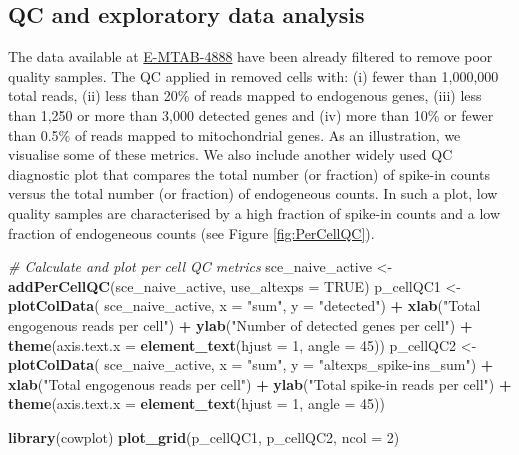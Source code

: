 \documentclass[9pt,a4paper,]{extarticle}
\newenvironment{Shaded}{\begin{snugshade}}{\end{snugshade}}
\newcommand{\CommentTok}[1]{\textcolor[rgb]{0.56,0.35,0.01}{\textit{#1}}}
\newcommand{\DataTypeTok}[1]{\textcolor[rgb]{0.13,0.29,0.53}{#1}}
\newcommand{\DecValTok}[1]{\textcolor[rgb]{0.00,0.00,0.81}{#1}}
\newcommand{\KeywordTok}[1]{\textcolor[rgb]{0.13,0.29,0.53}{\textbf{#1}}}
\newcommand{\NormalTok}[1]{#1}
\newcommand{\OperatorTok}[1]{\textcolor[rgb]{0.81,0.36,0.00}{\textbf{#1}}}
\newcommand{\OtherTok}[1]{\textcolor[rgb]{0.56,0.35,0.01}{#1}}
\newcommand{\StringTok}[1]{\textcolor[rgb]{0.31,0.60,0.02}{#1}}
\begin{document}
\hypertarget{qc-and-exploratory-data-analysis-1}{%
\subsection{QC and exploratory data analysis}\label{qc-and-exploratory-data-analysis-1}}

The data available at
\href{https://www.ebi.ac.uk/arrayexpress/experiments/E-MTAB-4888/}{E-MTAB-4888} have
been already filtered to remove poor quality samples.
The QC applied in \citep{Martinez-jimenez2017} removed cells with: (i) fewer
than 1,000,000 total reads, (ii) less than 20\% of reads mapped to
endogenous genes, (iii) less than 1,250 or more than 3,000 detected genes and
(iv) more than 10\% or fewer than 0.5\% of reads mapped to mitochondrial genes.
As an illustration, we visualise some of these metrics.
We also include another widely used QC diagnostic plot that compares the total
number (or fraction) of spike-in counts versus the total number (or fraction) of
endogeneous counts.
In such a plot, low quality samples are characterised by a high fraction of
spike-in counts and a low fraction of endogeneous counts
(see Figure \ref{fig:PerCellQC}).

\begin{Shaded}
\begin{Highlighting}[]
\CommentTok{# Calculate and plot per cell QC metrics}
\NormalTok{sce_naive_active <-}\StringTok{ }\KeywordTok{addPerCellQC}\NormalTok{(sce_naive_active, }\DataTypeTok{use_altexps =} \OtherTok{TRUE}\NormalTok{)}
\NormalTok{p_cellQC1 <-}\StringTok{ }\KeywordTok{plotColData}\NormalTok{(}
\NormalTok{  sce_naive_active, }
  \DataTypeTok{x =} \StringTok{"sum"}\NormalTok{, }
  \DataTypeTok{y =} \StringTok{"detected"}\NormalTok{) }\OperatorTok{+}
\StringTok{  }\KeywordTok{xlab}\NormalTok{(}\StringTok{"Total engogenous reads per cell"}\NormalTok{) }\OperatorTok{+}
\StringTok{  }\KeywordTok{ylab}\NormalTok{(}\StringTok{"Number of detected genes per cell"}\NormalTok{) }\OperatorTok{+}
\StringTok{  }\KeywordTok{theme}\NormalTok{(}\DataTypeTok{axis.text.x =} \KeywordTok{element_text}\NormalTok{(}\DataTypeTok{hjust =} \DecValTok{1}\NormalTok{, }\DataTypeTok{angle =} \DecValTok{45}\NormalTok{))}
\NormalTok{p_cellQC2 <-}\StringTok{ }\KeywordTok{plotColData}\NormalTok{(}
\NormalTok{  sce_naive_active, }
  \DataTypeTok{x =} \StringTok{"sum"}\NormalTok{, }
  \DataTypeTok{y =} \StringTok{"altexps_spike-ins_sum"}\NormalTok{) }\OperatorTok{+}
\StringTok{  }\KeywordTok{xlab}\NormalTok{(}\StringTok{"Total engogenous reads per cell"}\NormalTok{) }\OperatorTok{+}
\StringTok{  }\KeywordTok{ylab}\NormalTok{(}\StringTok{"Total spike-in reads per cell"}\NormalTok{) }\OperatorTok{+}
\StringTok{  }\KeywordTok{theme}\NormalTok{(}\DataTypeTok{axis.text.x =} \KeywordTok{element_text}\NormalTok{(}\DataTypeTok{hjust =} \DecValTok{1}\NormalTok{, }\DataTypeTok{angle =} \DecValTok{45}\NormalTok{))}

\KeywordTok{library}\NormalTok{(cowplot)}
\KeywordTok{plot_grid}\NormalTok{(p_cellQC1, p_cellQC2, }\DataTypeTok{ncol =} \DecValTok{2}\NormalTok{)}
\end{Highlighting}
\end{Shaded}
\end{document}
